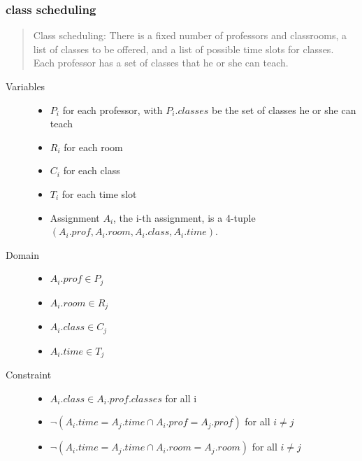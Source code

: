 \subsubsection{class scheduling}
\begin{quote}
  Class scheduling: There is a fixed number of professors and
  classrooms, a list of classes to be offered, and a list of possible
  time slots for classes.  Each professor has a set of classes that he
  or she can teach.
\end{quote}

\begin{description}
\item [Variables]
  \begin{itemize}
  \item $P_i$ for each professor, with $P_i.classes$ be the set of classes he or she can teach
  \item $R_i$ for each room
  \item $C_i$ for each class
  \item $T_i$ for each time slot
  \item Assignment $A_i$, the i-th assignment, is a 4-tuple $(A_i.prof, A_i.room, A_i.class, A_i.time)$.
  \end{itemize}
\item [Domain]
  \begin{itemize}
  \item $A_i.prof \in {P_j}$
  \item $A_i.room \in {R_j}$
  \item $A_i.class \in {C_j}$
  \item $A_i.time \in {T_j}$
  \end{itemize}
\item [Constraint]
  \begin{itemize}
  \item $A_i.class \in A_i.prof.classes$ for all i
  \item $\neg (A_i.time = A_j.time \cap A_i.prof = A_j.prof)$ for all $i \neq j$
  \item $\neg (A_i.time = A_j.time \cap A_i.room = A_j.room)$ for all $i \neq j$
  \end{itemize}
\end{description}


